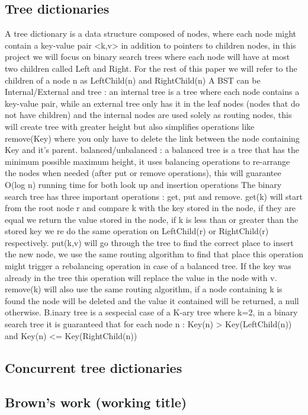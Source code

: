 \documentclass{article}
\begin{document}
\subsection{Tree dictionaries}
A tree dictionary is a data structure composed of nodes, where each node might contain a key-value pair <k,v> in addition to pointers to children nodes, in this project we will focus on binary search trees where each node will have at most two children called Left and Right. For the rest of this paper we will refer to the children of a node n as LeftChild(n) and RightChild(n) \newline
A BST can be Internal/External and tree : an internal tree is a tree where each node contains a key-value pair, while an external tree only has it in the leaf nodes (nodes that do not have children) and the internal nodes are used solely as routing nodes, this will create tree with greater height but also simplifies operations like remove(Key) where you only have to delete the link between the node containing Key and it's parent.
balanced/unbalanced : a balanced tree is a tree that has the minimum possible maximum height, it uses balancing operations to re-arrange the nodes when needed (after put or remove operations), this will guarantee O(log n) running time for both look up and insertion operations 
The binary search tree has three important operations : get, put and remove.
get(k) will start from the root node r and compare k with the key stored in the node, if they are equal we  return the value stored in the node, if k is less than or greater than the stored key we re do the same operation on LeftChild(r) or RightChild(r) respectively.
put(k,v) will go through the tree to find the correct place to insert the new node, we use the same routing algorithm to find that place this operation might trigger a rebalancing operation in case of a balanced tree. If the key was already in the tree this operation will replace the value in the node with v.
remove(k) will also use the same routing algorithm, if a node containing k is found the node will be deleted and the value it contained will be returned, a null otherwise.
B.inary tree is a sespecial case of a K-ary tree where k=2, in a binary search tree it is guaranteed that for  each node n : Key(n) > Key(LeftChild(n)) and Key(n) <= Key(RightChild(n)) 

\subsection{Concurrent tree dictionaries}
\subsection{Brown's work (working title)}
\end{document}
